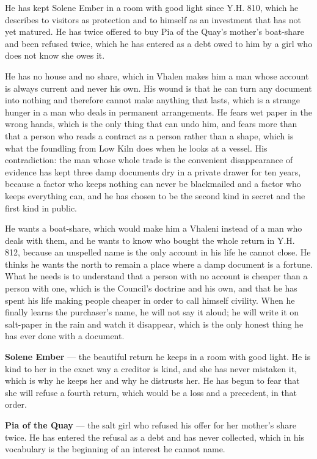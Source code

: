 \documentclass{design/chronicle}
\begin{document}
{He has kept Solene Ember in a room with good light since Y.H. 810, which he describes to visitors as protection and to himself as an investment that has not yet matured. He has twice offered to buy Pia of the Quay’s mother’s boat-share and been refused twice, which he has entered as a debt owed to him by a girl who does not know she owes it.

He has no house and no share, which in Vhalen makes him a man whose account is always current and never his own. His wound is that he can turn any document into nothing and therefore cannot make anything that lasts, which is a strange hunger in a man who deals in permanent arrangements. He fears wet paper in the wrong hands, which is the only thing that can undo him, and fears more than that a person who reads a contract as a person rather than a shape, which is what the foundling from Low Kiln does when he looks at a vessel. His contradiction: the man whose whole trade is the convenient disappearance of evidence has kept three damp documents dry in a private drawer for ten years, because a factor who keeps nothing can never be blackmailed and a factor who keeps everything can, and he has chosen to be the second kind in secret and the first kind in public.

He wants a boat-share, which would make him a Vhaleni instead of a man who deals with them, and he wants to know who bought the whole return in Y.H. 812, because an unspelled name is the only account in his life he cannot close. He thinks he wants the north to remain a place where a damp document is a fortune. What he needs is to understand that a person with no account is cheaper than a person with one, which is the Council’s doctrine and his own, and that he has spent his life making people cheaper in order to call himself civility. When he finally learns the purchaser’s name, he will not say it aloud; he will write it on salt-paper in the rain and watch it disappear, which is the only honest thing he has ever done with a document.

\textbf{Solene Ember} — the beautiful return he keeps in a room with good light. He is kind to her in the exact way a creditor is kind, and she has never mistaken it, which is why he keeps her and why he distrusts her. He has begun to fear that she will refuse a fourth return, which would be a loss and a precedent, in that order.

\textbf{Pia of the Quay} — the salt girl who refused his offer for her mother’s share twice. He has entered the refusal as a debt and has never collected, which in his vocabulary is the beginning of an interest he cannot name.

}
\end{document}
